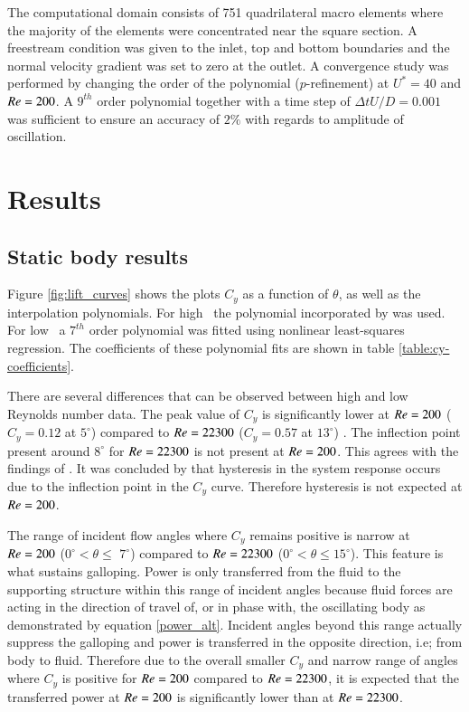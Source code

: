 The computational domain consists of 751 quadrilateral macro elements where the majority of the elements were concentrated near the square section. A freestream condition was given to the inlet, top and bottom boundaries and the normal velocity gradient was set to zero at the outlet. A convergence study was performed by changing the order of the polynomial ($p$-refinement) at $U^*=40$ and $Re=200$. A $9^{th}$ order polynomial together with a time step of $\Delta tU/D=0.001$ was sufficient to ensure an accuracy of $2\%$ with regards to amplitude of oscillation.
  
\section{Results}
\label{sec:results}
  
\subsection{Static body results}
Figure \ref{fig:lift_curves} shows the plots $C_y$ as a function of $\theta$, as well as the interpolation polynomials. For high \reynoldsnumber\ the polynomial incorporated by \cite{Parkinson1964} was used. For low \reynoldsnumber\ a $7^{th}$ order polynomial was fitted using nonlinear least-squares regression. The coefficients of these polynomial fits are shown in table \ref{table:cy-coefficients}.





There are several differences that can be observed between high and low Reynolds number data. The peak value of $C_y$ is  significantly lower at $Re=200$ ($C_y=0.12$ at $5^\circ$) compared to $Re=22300$ ($C_y=0.57$ at $13^\circ$) . The inflection point present around $8^\circ$ for $Re=22300$ is not present at $Re=200$. This agrees with the findings of \cite{Luo2003}.  It was concluded by \cite{Luo2003} that hysteresis in the system response occurs due to the inflection point in the $C_y$ curve. Therefore hysteresis is not expected at $Re=200$.
    
The range of incident flow angles where $C_y$ remains positive is narrow at $Re=200$ ($0^\circ <\theta \leq$ $7^\circ$) compared to $Re=22300$ ($0^\circ <\theta \leq 15^\circ$). This feature is what sustains galloping. Power is only transferred from the fluid to the supporting structure within this range of incident angles because fluid forces are acting in the direction of travel of, or in phase with, the oscillating body as demonstrated by equation \ref{power_alt}. Incident angles beyond this range actually suppress the galloping and power is transferred in the opposite direction, i.e; from body to fluid. Therefore due to the overall smaller $C_y$ and narrow range of angles where $C_y$ is positive for $Re=200$ compared to $Re=22300$, it is expected that the transferred power at $Re=200$ is significantly lower than at $Re=22300$.

